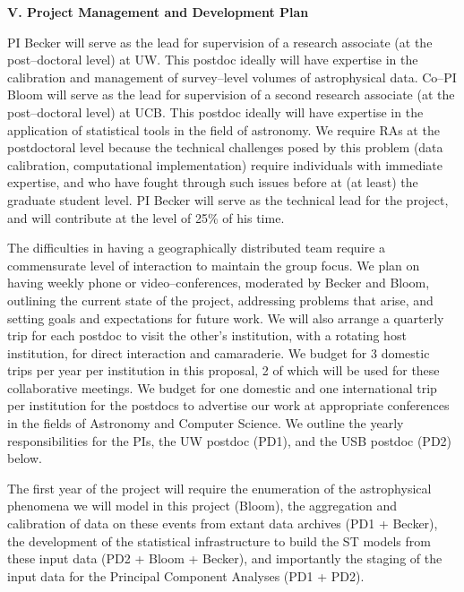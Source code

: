 \bigskip \centerline{\bf V. Project Management and Development Plan} \smallskip

PI Becker will serve as the lead for supervision of a research associate (at the
post--doctoral level) at UW.  This postdoc ideally will have expertise in the
calibration and management of survey--level volumes of astrophysical data.
Co--PI Bloom will serve as the lead for supervision of a second research
associate (at the post--doctoral level) at UCB.  This postdoc ideally will have
expertise in the application of statistical tools in the field of astronomy.  We
require RAs at the postdoctoral level because the technical challenges posed by
this problem (data calibration, computational implementation) require
individuals with immediate expertise, and who have fought through such issues
before at (at least) the graduate student level. PI Becker will serve as the
technical lead for the project, and will contribute at the level of 25\% of his
time.

The difficulties in having a geographically distributed team require a
commensurate level of interaction to maintain the group focus.  We plan on
having weekly phone or video--conferences, moderated by Becker and Bloom,
outlining the current state of the project, addressing problems that arise, and
setting goals and expectations for future work.  We will also arrange a
quarterly trip for each postdoc to visit the other's institution, with a
rotating host institution, for direct interaction and camaraderie. We budget for
3 domestic trips per year per institution in this proposal, 2 of which will be
used for these collaborative meetings.  We budget for one domestic and one
international trip per institution for the postdocs to advertise our work at
appropriate conferences in the fields of Astronomy and Computer Science. We
outline the yearly responsibilities for the PIs, the UW postdoc (PD1), and the
USB postdoc (PD2) below.

 \smallskip

The first year of the project will require the enumeration of the astrophysical
phenomena we will model in this project (Bloom), the aggregation and calibration
of data on these events from extant data archives (PD1 + Becker), the
development of the statistical infrastructure to build the ST models from these
input data (PD2 + Bloom + Becker), and importantly the staging of the input data
for the Principal Component Analyses (PD1 + PD2).

 \smallskip

